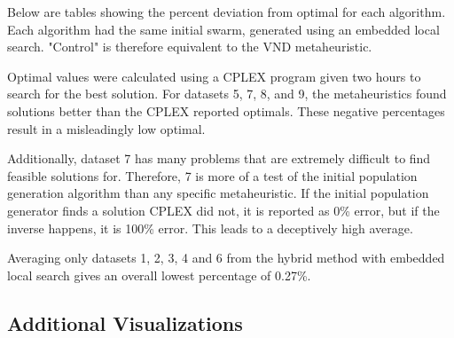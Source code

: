 \documentclass[11pt, letterpaper, onecolumn]{article}
\begin{document}
Below are tables showing the percent deviation from optimal for each algorithm. Each algorithm had the same initial swarm, generated using an embedded local search. "Control" is therefore equivalent to the VND metaheuristic. 

Optimal values were calculated using a CPLEX program given two hours to search for the best solution. For datasets 5, 7, 8, and 9, the metaheuristics found solutions better than the CPLEX reported optimals. These negative percentages result in a misleadingly low optimal. 

Additionally, dataset 7 has many problems that are extremely difficult to find feasible solutions for. Therefore, 7 is more of a test of the initial population generation algorithm than any specific metaheuristic. If the initial population generator finds a solution CPLEX did not, it is reported as 0\% error, but if the inverse happens, it is 100\% error. This leads to a deceptively high average. 

Averaging only datasets 1, 2, 3, 4 and 6 from the hybrid method with embedded local search gives an overall lowest percentage of 0.27\%. 

\begin{table}[htbp]
\end{table}

\begin{table}[htbp]
\end{table}


\begin{table}[htbp] 
\end{table}

\clearpage

\subsection{Additional Visualizations}
\end{document}

